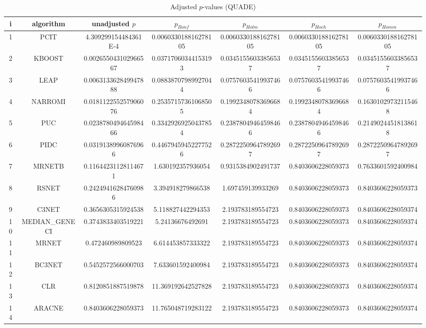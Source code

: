 \documentclass[a4paper,10pt]{article}
\begin{document}
\begin{landscape}
\begin{table}[!htp]
\centering\scriptsize
\caption{Adjusted $p$-values (QUADE)}
\begin{tabular}{ccccccc}
i&algorithm&unadjusted $p$&$p_{Bonf}$&$p_{Holm}$&$p_{Hoch}$&$p_{Homm}$\\
\hline
1&PCIT&4.309299154484361E-4&0.006033018816278105&0.006033018816278105&0.006033018816278105&0.006033018816278105\\
2&KBOOST&0.002655043102966567&0.03717060344153193&0.03451556033856537&0.03451556033856537&0.03451556033856537\\
3&LEAP&0.006313362849947888&0.08838707989927044&0.07576035419937466&0.07576035419937466&0.07576035419937466\\
4&NARROMI&0.018112255257906076&0.25357157361068505&0.19923480783696684&0.19923480783696684&0.16301029732115468\\
5&PUC&0.023878049464598466&0.33429269250437854&0.23878049464598466&0.23878049464598466&0.21490244518138618\\
6&PIDC&0.03191389960876966&0.44679459452277526&0.28722509647892697&0.28722509647892697&0.28722509647892697\\
7&MRNETB&0.11644231128114671&1.630192357936054&0.9315384902491737&0.8403606228059373&0.7633601592400984\\
8&RSNET&0.24249416284760986&3.394918279866538&1.697459139933269&0.8403606228059373&0.8403606228059373\\
9&C3NET&0.3656305315924538&5.118827442294353&2.193783189554723&0.8403606228059373&0.8403606228059374\\
10&MEDIAN_GENECI&0.3743833403519221&5.24136676492691&2.193783189554723&0.8403606228059373&0.8403606228059374\\
11&MRNET&0.472460989809523&6.614453857333322&2.193783189554723&0.8403606228059373&0.8403606228059374\\
12&BC3NET&0.5452572566000703&7.633601592400984&2.193783189554723&0.8403606228059373&0.8403606228059374\\
13&CLR&0.8120851887519878&11.369192642527828&2.193783189554723&0.8403606228059373&0.8403606228059374\\
14&ARACNE&0.8403606228059373&11.765048719283122&2.193783189554723&0.8403606228059373&0.8403606228059374\\
\hline
\end{tabular}
\end{table}


\end{landscape}
\end{document}
